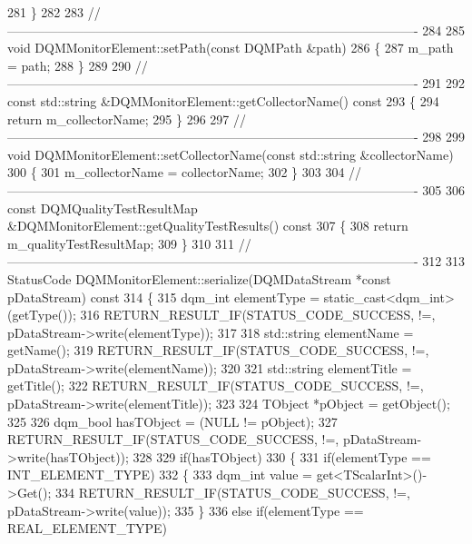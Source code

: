 \begin{DoxyCode}
281 \}
282 
283 \textcolor{comment}{//-------------------------------------------------------------------------------------------------}
284 
285 \textcolor{keywordtype}{void} DQMMonitorElement::setPath(\textcolor{keyword}{const} DQMPath &path)
286 \{
287   m\_path = path;
288 \}
289 
290 \textcolor{comment}{//-------------------------------------------------------------------------------------------------}
291 
292 \textcolor{keyword}{const} std::string &DQMMonitorElement::getCollectorName()\textcolor{keyword}{ const}
293 \textcolor{keyword}{}\{
294   \textcolor{keywordflow}{return} m\_collectorName;
295 \}
296 
297 \textcolor{comment}{//-------------------------------------------------------------------------------------------------}
298 
299 \textcolor{keywordtype}{void} DQMMonitorElement::setCollectorName(\textcolor{keyword}{const} std::string &collectorName)
300 \{
301   m\_collectorName = collectorName;
302 \}
303 
304 \textcolor{comment}{//-------------------------------------------------------------------------------------------------}
305 
306 \textcolor{keyword}{const} DQMQualityTestResultMap &DQMMonitorElement::getQualityTestResults()\textcolor{keyword}{ const}
307 \textcolor{keyword}{}\{
308   \textcolor{keywordflow}{return} m\_qualityTestResultMap;
309 \}
310 
311 \textcolor{comment}{//-------------------------------------------------------------------------------------------------}
312 
313 StatusCode DQMMonitorElement::serialize(DQMDataStream *\textcolor{keyword}{const} pDataStream)\textcolor{keyword}{ const}
314 \textcolor{keyword}{}\{
315   dqm_int elementType = \textcolor{keyword}{static\_cast<}dqm_int\textcolor{keyword}{>}(getType());
316   RETURN_RESULT_IF(STATUS\_CODE\_SUCCESS, !=, pDataStream->write(elementType));
317 
318   std::string elementName = getName();
319   RETURN_RESULT_IF(STATUS\_CODE\_SUCCESS, !=, pDataStream->write(elementName));
320 
321   std::string elementTitle = getTitle();
322   RETURN_RESULT_IF(STATUS\_CODE\_SUCCESS, !=, pDataStream->write(elementTitle));
323 
324   TObject *pObject = getObject();
325 
326   dqm_bool hasTObject = (NULL != pObject);
327   RETURN_RESULT_IF(STATUS\_CODE\_SUCCESS, !=, pDataStream->write(hasTObject));
328 
329   \textcolor{keywordflow}{if}(hasTObject)
330   \{
331     \textcolor{keywordflow}{if}(elementType == INT\_ELEMENT\_TYPE)
332     \{
333       dqm_int value = get<TScalarInt>()->Get();
334       RETURN_RESULT_IF(STATUS\_CODE\_SUCCESS, !=, pDataStream->write(value));
335     \}
336     \textcolor{keywordflow}{else} \textcolor{keywordflow}{if}(elementType == REAL\_ELEMENT\_TYPE)

\end{DoxyCode}
